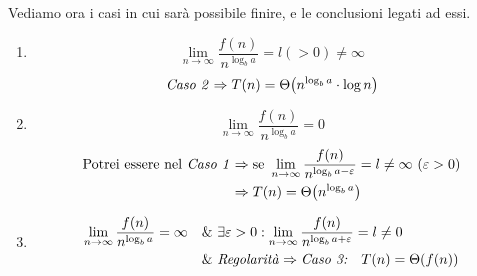 Vediamo ora i casi in cui sarà possibile finire, e le conclusioni legati ad essi.
\begin{enumerate}[label=\Alph*)]
    \item $$\lim_{n \to \infty} \frac{f(n)}{n^{\log_b a}} = l (> 0) \neq \infty$$
    $$\text{\emph{Caso 2}} \Rightarrow T(n) = \Theta \big( n^{\log_b a} \cdot \log n \big)$$

    \item $$\lim_{n \to \infty} \frac{f(n)}{n^{\log_b a}} = 0 $$
    \begin{align*}
        \text{Potrei essere nel \emph{Caso 1}} & \Rightarrow \text{se } \lim_{n \to \infty} \frac{f(n)}{n^{\log_b a - \varepsilon}} = l \neq \infty \ (\varepsilon > 0) \\
        & \Rightarrow T(n) = \Theta \big( n^{\log_b a} \big)
    \end{align*}
    \item 
    \begin{align*}
    \lim_{n \to \infty} \frac{f(n)}{n^{\log_b a}} = \infty \quad & \& \ \exists \varepsilon > 0 : 
    \lim_{n \to \infty} \frac{f(n)}{n^{\log_b a + \varepsilon}} = l \neq 0 \\
    & \& \ \text{\emph{Regolarità}} \Rightarrow \emph{Caso 3:} \quad T(n) = \Theta (f(n))
    \end{align*}

\end{enumerate}

